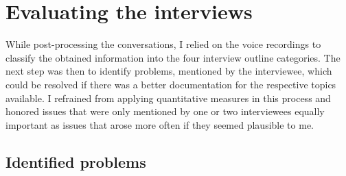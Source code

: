 \section{Evaluating the interviews}

While post-processing the conversations, I relied on the voice recordings to classify the obtained information into the four interview outline categories. The next step was then to identify problems, mentioned by the interviewee, which could be resolved if there was a better documentation for the respective topics available. I refrained from applying quantitative measures in this process and honored issues that were only mentioned by one or two interviewees equally important as issues that arose more often if they seemed plausible to me.

\subsection{Identified problems}

